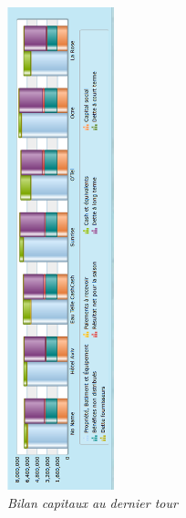 \documentclass[a4paper,10pt]{article}
\begin{document}
    \begin{figure}[!ht]
      \begin{center}
	\includegraphics[height=14cm,keepaspectratio]{./images/bilan_t8.png}
      \end{center}
      \caption{\textit{Bilan capitaux au dernier tour}}
    \end{figure}
    
\end{document}
